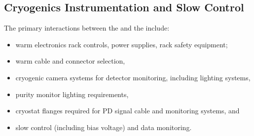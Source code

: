 

\subsection{Cryogenics Instrumentation and Slow Control}
\label{sec:fdsp-pd-intfc-xeon}

The primary interactions between the  and the  include:

\begin{itemize}
    \item warm electronics rack controls, power supplies, rack safety equipment;
    \item warm cable and connector selection,
    \item cryogenic camera systems for detector monitoring, including lighting systems,
    \item purity monitor lighting requirements,
    \item cryostat flanges required for PD signal cable and monitoring systems, and
    \item {} slow control (including bias voltage) and data monitoring.
\end{itemize}

